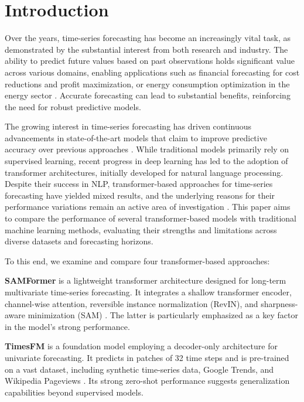 \chapter{Introduction}\label{ch01:intro}

Over the years, time-series forecasting has become an increasingly vital task, as demonstrated by the substantial interest from both research and industry. The ability to predict future values based on past observations holds significant value across various domains, enabling applications such as financial forecasting for cost reductions and profit maximization, or energy consumption optimization in the energy sector \cite{jin2023timellm, Papastefanopoulos2023MultivariateTF}. Accurate forecasting can lead to substantial benefits, reinforcing the need for robust predictive models.

The growing interest in time-series forecasting has driven continuous advancements in state-of-the-art models that claim to improve predictive accuracy over previous approaches \cite{li2023generativetimeseriesforecasting}. While traditional models primarily rely on supervised learning, recent progress in deep learning has led to the adoption of transformer architectures, initially developed for natural language processing. Despite their success in NLP, transformer-based approaches for time-series forecasting have yielded mixed results, and the underlying reasons for their performance variations remain an active area of investigation \cite{PuspitaSari2024SeaLT}. This paper aims to compare the performance of several transformer-based models with traditional machine learning methods, evaluating their strengths and limitations across diverse datasets and forecasting horizons.

To this end, we examine and compare four transformer-based approaches:

\textbf{SAMFormer} is a lightweight transformer architecture designed for long-term multivariate time-series forecasting. It integrates a shallow transformer encoder, channel-wise attention, reversible instance normalization (RevIN), and sharpness-aware minimization (SAM) \cite{Huang2024LeRetLR}. The latter is particularly emphasized as a key factor in the model's strong performance. 

\textbf{TimesFM} is a foundation model employing a decoder-only architecture for univariate forecasting. It predicts in patches of 32 time steps and is pre-trained on a vast dataset, including synthetic time-series data, Google Trends, and Wikipedia Pageviews \cite{Fisher2024TimeseriesFM}. Its strong zero-shot performance suggests generalization capabilities beyond supervised models.

